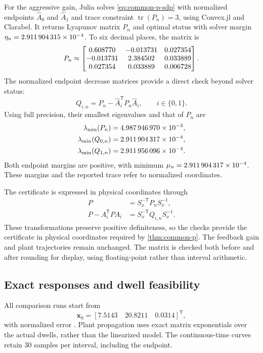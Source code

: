 \documentclass[pdflatex,iicol,sn-mathphys-ay]{sn-jnl}
\newcommand{\vect}[1]{\bm{#1}}
\begin{document}
For the aggressive gain, Julia solves \eqref{eq:common-p-sdp} with normalized endpoints $\widehat A_0$ and $\widehat A_1$ and trace constraint $\operatorname{tr}(P_n)=3$, using Convex.jl and Clarabel. It returns Lyapunov matrix $P_n$ and optimal status with solver margin $\eta_n=\num{2.911904315e-04}$. To six decimal places, the matrix is
\begin{equation}
    P_n\approx\begin{bmatrix} 0.608770 & -0.013731 & 0.027354\\ -0.013731 & 2.384502 & 0.033889\\ 0.027354 & 0.033889 & 0.006728 \end{bmatrix}.
    \label{eq:numerical-p}
\end{equation}
The normalized endpoint decrease matrices provide a direct check beyond solver status:
\[
    Q_{i,n}=P_n-\widehat A_i^{\mathsf T}P_n\widehat A_i,\qquad i\in\{0,1\}.
\]
Using full precision, their smallest eigenvalues and that of $P_n$ are
\begin{equation}
\begin{aligned}
    \lambda_{\min}(P_n)&=\num{4.987946970e-03},\\
    \lambda_{\min}(Q_{0,n})&=\num{2.911904317e-04},\\
    \lambda_{\min}(Q_{1,n})&=\num{2.911956096e-04}.
\end{aligned}
\label{eq:numerical-margins}
\end{equation}
Both endpoint margins are positive, with minimum $\mu_n=\num{2.911904317e-04}$. These margins and the reported trace refer to normalized coordinates.

The certificate is expressed in physical coordinates through
\[
\begin{aligned}
    P&=S_x^{-\mathsf T}P_nS_x^{-1},\\
    P-A_i^{\mathsf T}PA_i&=S_x^{-\mathsf T}Q_{i,n}S_x^{-1}.
\end{aligned}
\]
These transformations preserve positive definiteness, so the checks provide the certificate in physical coordinates required by \cref{thm:common-p}. The feedback gain and plant trajectories remain unchanged. The matrix is checked both before and after rounding for display, using floating-point rather than interval arithmetic.

\subsection{Exact responses and dwell feasibility}

All comparison runs start from
\begin{equation}
    \vect{x}_0=[7.5143\quad20.8211\quad0.0314]^{\mathsf T},
\end{equation}
with normalized error \InitialNormalizedError{}. Plant propagation uses exact matrix exponentials over the actual dwells, rather than the linearized model. The continuous-time curves retain 30 samples per interval, including the endpoint.
\end{document}

